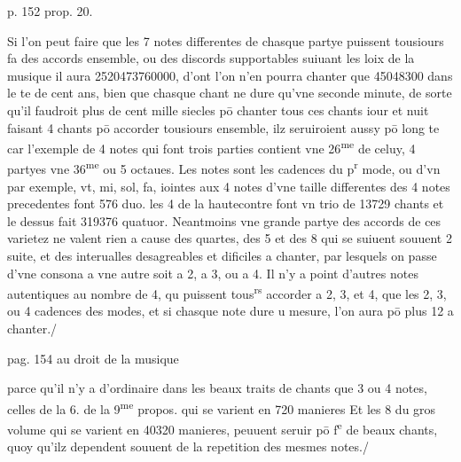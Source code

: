 \documentclass[11pt,a4paper]{article}
\begin{document}
p. 152 prop. 20.

Si l'on peut faire que les 7 notes differentes de chasque partye puissent tousiours fa\ill{} des accords ensemble, ou des discords supportables suiuant les loix de la musique il  aura 2520473760000, d'ont l'on n'en pourra chanter que 45048300 dans le te\ill{} de cent ans, bien que chasque chant ne dure qu'vne seconde minute, de sorte qu'il faudroit plus de cent mille siecles pō chanter tous ces chants iour et nuit faisant 4 chants pō accorder tousiours ensemble, ilz seruiroient aussy pō long te\ill{} car l'exemple de 4 notes qui font trois parties contient vne 26\textsuperscript{me} de celuy, \ill{} 4 partyes vne 36\textsuperscript{me} ou 5 octaues. Les notes sont les cadences du p\textsuperscript{r} mode, ou d'vn \ill{} par exemple, vt, mi, sol, fa, iointes aux 4 notes d'vne taille differentes des 4 notes precedentes font 576 duo. les 4 de la hautecontre font vn trio de 13729 chants et le dessus fait 319376 quatuor. Neantmoins vne grande partye des accords de ces varietez ne valent rien a cause des quartes, des 5 et des 8 qui se suiuent souuent 2 \ill{} suite, et des interualles desagreables et dificiles a chanter, par lesquels on passe d'vne consona\ill{} a vne autre soit a 2, a 3, ou a 4. Il n'y a point d'autres notes autentiques au nombre de 4, qu puissent tous\textsuperscript{rs} accorder a 2, 3, et 4, que les 2, 3, ou 4 cadences des modes, et si chasque note dure u\ill{} mesure, l'on aura pō plus 12 \ill{} a chanter./



pag. 154 au droit de la musique

parce qu'il n'y a d'ordinaire dans les beaux traits de chants que 3 ou 4 notes, celles de la 6. de la 9\textsuperscript{me} propos. qui se varient en 720 manieres Et les 8 du gros volume qui se varient en 40320 manieres, peuuent seruir pō f\textsuperscript{e} de beaux chants, quoy qu'ilz dependent souuent de la repetition des mesmes notes./

\end{document}
